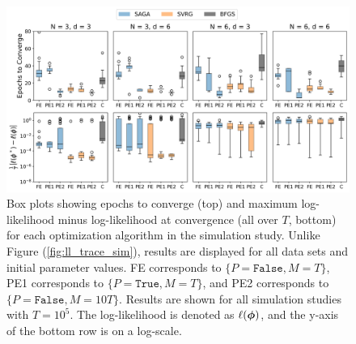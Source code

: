 \begin{figure}%
    \centering
    \includegraphics[width=6.5in]{../plt/boxplots_sim_T_100000.png}
    \caption{Box plots showing epochs to converge (top) and maximum log-likelihood minus log-likelihood at convergence (all over $T$, bottom) for each optimization algorithm in the simulation study. Unlike Figure (\ref{fig:ll_trace_sim}), results are displayed for all data sets and initial parameter values. FE corresponds to $\{P = \texttt{False}, M = T\}$, PE1 corresponds to $\{P = \texttt{True}, M = T\}$, and PE2 corresponds to $\{P = \texttt{False}, M = 10T\}$. %
    Results are shown for all simulation studies with $T=10^{5}$. %
    The log-likelihood is denoted as $\ell(\boldsymbol{\phi})$, and the y-axis of the bottom row is on a log-scale.}
    \label{fig:boxplots_sim}
\end{figure}
%
